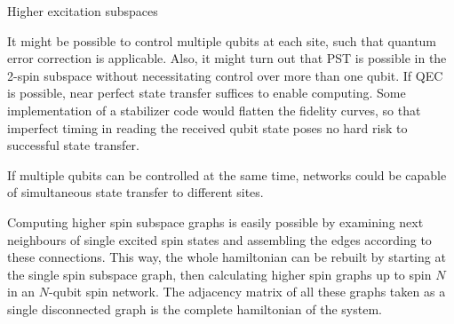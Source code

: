 {\begin{frame}{Higher excitation subspaces}
\end{frame}}

\begin{center}
\end{center}

\noindent It might be possible to control multiple qubits at each site, such that quantum error correction is applicable\cite{Devitt2013}. Also, it might turn out that PST is possible in the 2-spin subspace without necessitating control over more than one qubit. If QEC is possible, near perfect state transfer suffices to enable computing\cite{Andrist2016}. Some implementation of a stabilizer code would flatten the fidelity curves, so that imperfect timing in reading the received qubit state poses no hard risk to successful state transfer.\par
If multiple qubits can be controlled at the same time, networks could be capable of simultaneous state transfer to different sites.\par
Computing higher spin subspace graphs is easily possible by examining next neighbours of single excited spin states and assembling the edges according to these connections. This way, the whole hamiltonian can be rebuilt by starting at the single spin subspace graph, then calculating higher spin graphs up to spin $N$ in an $N$-qubit spin network. The adjacency matrix of all these graphs taken as a single disconnected graph is the complete hamiltonian of the system.

